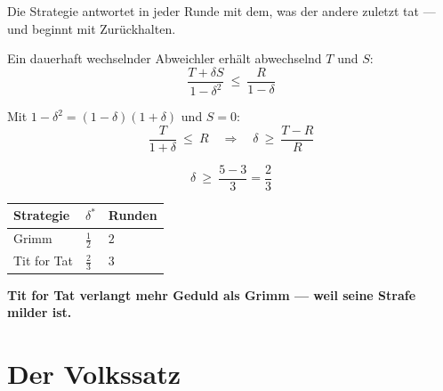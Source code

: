 \begin{merksatz}
Die Strategie  antwortet in jeder Runde mit dem, was der andere zuletzt tat --- und beginnt mit Zurückhalten.

Ein dauerhaft wechselnder Abweichler erhält abwechselnd $T$ und $S$:
\[ \frac{T+\delta S}{1-\delta^{2}} \ \le\ \frac{R}{1-\delta} \]

Mit $1-\delta^{2} = (1-\delta)(1+\delta)$ und $S=0$:
\[ \frac{T}{1+\delta} \ \le\ R \quad\Longrightarrow\quad \delta \ \ge\ \frac{T-R}{R} \]

\[ \delta \ \ge\ \frac{5-3}{3} = \frac23 \]

\begin{center}
{\small
\renewcommand{\arraystretch}{1.5}
\begin{tabular}{@{}P{2.4cm}P{2.0cm}P{2.6cm}@{}}
\toprule
\textbf{Strategie} & $\delta^{*}$ & \textbf{Runden}\\
\midrule
Grimm & $\tfrac12$ & $2$\\
Tit for Tat & $\tfrac23$ & $3$\\
\bottomrule
\end{tabular}}
\end{center}

\begin{center}
\begin{minipage}{0.9\textwidth}
\textbf{Tit for Tat verlangt mehr Geduld als Grimm --- weil seine Strafe milder ist.}
\end{minipage}
\end{center}

\begin{center}
\begin{minipage}{0.88\textwidth}
\end{minipage}
\end{center}
\end{merksatz}

\section{Der Volkssatz}

